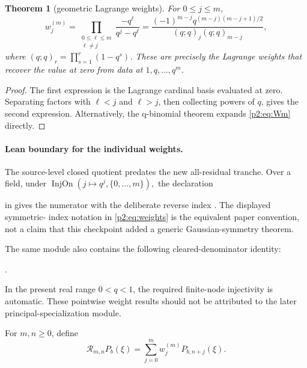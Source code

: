 \documentclass[11pt,oneside]{article}
\numberwithin{equation}{section}
\newtheorem{theorem}{Theorem}[section]
\theoremstyle{definition}
\theoremstyle{remark}
\begin{document}
\begin{theorem}[geometric Lagrange weights]
\label{p2:thm:weights}
For \(0\leq j\leq m\),
\begin{equation}
 w_j^{(m)}
 =\prod_{\substack{0\leq\ell\leq m\\\ell\ne j}}
 \frac{-q^\ell}{q^j-q^\ell}
 =\frac{(-1)^{m-j}q^{(m-j)(m-j+1)/2}}
 {(q;q)_j(q;q)_{m-j}},
 \label{p2:eq:weights}
\end{equation}
where \((q;q)_r=\prod_{s=1}^r(1-q^s)\). These are precisely the Lagrange
weights that recover the value at zero from data at \(1,q,\ldots,q^m\).
\end{theorem}

\begin{proof}
The first expression is the Lagrange cardinal basis evaluated at zero. Separating
factors with \(\ell<j\) and \(\ell>j\), then collecting powers of \(q\), gives the
second expression. Alternatively, the q-binomial theorem expands
\eqref{p2:eq:Wm} directly.
\end{proof}

\paragraph{Lean boundary for the individual weights.}
The source-level closed quotient predates the new all-residual tranche.  Over a field, under
\(
 \operatorname{InjOn}(j\mapsto q^j,\{0,\ldots,m\}),
\)
the declaration
\begin{center}
\end{center}
in  gives the numerator with the deliberate
reverse index .  The displayed symmetric-
index notation in \eqref{p2:eq:weights} is the equivalent paper convention, not a
claim that this checkpoint added a generic Gaussian-symmetry theorem.
\begin{samepage}
The same module also contains the following cleared-denominator identity:
\begin{center}
.
\end{center}
\end{samepage}
In the present
real range \(0<q<1\), the required finite-node injectivity is automatic.  These
pointwise weight results should not be attributed to the later
principal-specialization module.

\begin{definition}
For \(m,n\geq0\), define
\begin{equation}
 \mathcal R_{m,n}P_b(\xi)
 =\sum_{j=0}^m w_j^{(m)}P_{b,n+j}(\xi).
 \label{p2:eq:Rdef}
\end{equation}
\end{definition}
\end{document}
